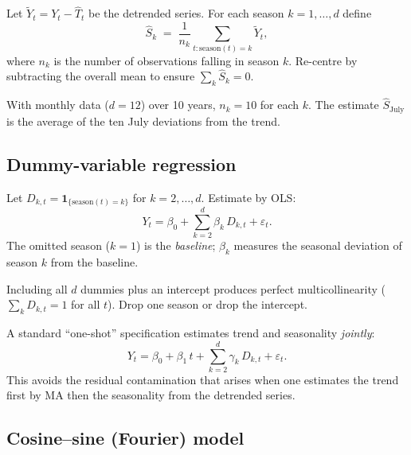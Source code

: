 \begin{defbox}
\label{def:seas-avg}
Let $\widetilde{Y}_t = Y_t - \widehat{T}_t$ be the detrended series.
For each season $k = 1, \dots, d$ define
\[
  \widehat{S}_k \;=\; \frac{1}{n_k}\sum_{t : \text{season}(t) = k}
                    \widetilde{Y}_t,
\]
where $n_k$ is the number of observations falling in season $k$.
Re-centre by subtracting the overall mean to ensure $\sum_k \widehat{S}_k = 0$.
\end{defbox}

\begin{exbox}
With monthly data ($d = 12$) over 10 years, $n_k = 10$ for each $k$.
The estimate $\widehat{S}_{\text{July}}$ is the average of the
ten July deviations from the trend.
\end{exbox}

\subsection{Dummy-variable regression}

\begin{defbox}
\label{def:dummies}
Let $D_{k,t} = \mathbf{1}_{\{\text{season}(t) = k\}}$ for $k = 2, \dots, d$.
Estimate by OLS:
\[
  Y_t = \beta_0 + \sum_{k=2}^{d} \beta_k\, D_{k,t} + \varepsilon_t.
\]
The omitted season ($k = 1$) is the \emph{baseline}; $\beta_k$
measures the seasonal deviation of season $k$ from the baseline.
\end{defbox}

\begin{rembox}
Including all $d$ dummies plus an intercept produces perfect
multicollinearity ($\sum_k D_{k,t} = 1$ for all $t$). Drop one season
or drop the intercept.
\end{rembox}

\begin{rembox}
A standard ``one-shot'' specification estimates trend and seasonality
\emph{jointly}:
\[
  Y_t = \beta_0 + \beta_1\, t + \sum_{k=2}^{d} \gamma_k\, D_{k,t} + \varepsilon_t.
\]
This avoids the residual contamination that arises when one estimates
the trend first by MA then the seasonality from the detrended series.
\end{rembox}

\subsection{Cosine--sine (Fourier) model}

